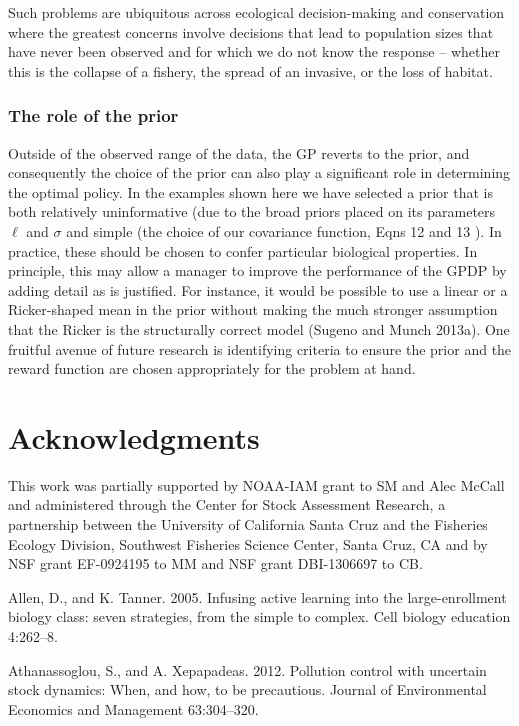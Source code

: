 \documentclass[author-year, 12pt,review]{components/elsarticle} %
\begin{document}
Such problems are ubiquitous across ecological decision-making and
conservation where the greatest concerns involve decisions that lead to
population sizes that have never been observed and for which we do not
know the response -- whether this is the collapse of a fishery, the
spread of an invasive, or the loss of habitat.

\subsubsection{The role of the prior}\label{the-role-of-the-prior}

Outside of the observed range of the data, the GP reverts to the prior,
and consequently the choice of the prior can also play a significant
role in determining the optimal policy. In the examples shown here we
have selected a prior that is both relatively uninformative (due to the
broad priors placed on its parameters \(\ell\) and \(\sigma\) and simple
(the choice of our covariance function, Eqns 12 and 13 ). In practice,
these should be chosen to confer particular biological properties. In
principle, this may allow a manager to improve the performance of the
GPDP by adding detail as is justified. For instance, it would be
possible to use a linear or a Ricker-shaped mean in the prior without
making the much stronger assumption that the Ricker is the structurally
correct model (Sugeno and Munch 2013a). One fruitful avenue of future
research is identifying criteria to ensure the prior and the reward
function are chosen appropriately for the problem at hand.

\section{Acknowledgments}\label{acknowledgments}

This work was partially supported by NOAA-IAM grant to SM and Alec
McCall and administered through the Center for Stock Assessment
Research, a partnership between the University of California Santa Cruz
and the Fisheries Ecology Division, Southwest Fisheries Science Center,
Santa Cruz, CA and by NSF grant EF-0924195 to MM and NSF grant
DBI-1306697 to CB.

Allen, D., and K. Tanner. 2005. Infusing active learning into the
large-enrollment biology class: seven strategies, from the simple to
complex. Cell biology education 4:262--8.

Athanassoglou, S., and A. Xepapadeas. 2012. Pollution control with
uncertain stock dynamics: When, and how, to be precautious. Journal of
Environmental Economics and Management 63:304--320.
\end{document}
